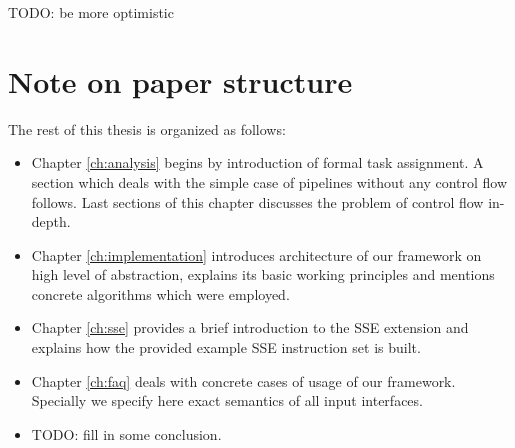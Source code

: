 TODO: be more optimistic

\section{Note on paper structure}

The rest of this thesis is organized as follows:
\begin{itemize}
  \item Chapter \ref{ch:analysis} begins by introduction of formal task assignment. A section which deals with the simple case of pipelines without any control flow follows. Last sections of this chapter discusses the problem of control flow in-depth.
  \item Chapter \ref{ch:implementation} introduces architecture of our framework on high level of abstraction, explains its basic working principles and mentions concrete algorithms which were employed.
  \item Chapter \ref{ch:sse} provides a brief introduction to the SSE extension and explains how the provided example SSE instruction set is built.
  \item Chapter \ref{ch:faq} deals with concrete cases of usage of our framework. Specially we specify here exact semantics of all input interfaces.
  \item TODO: fill in some conclusion.
\end{itemize}



